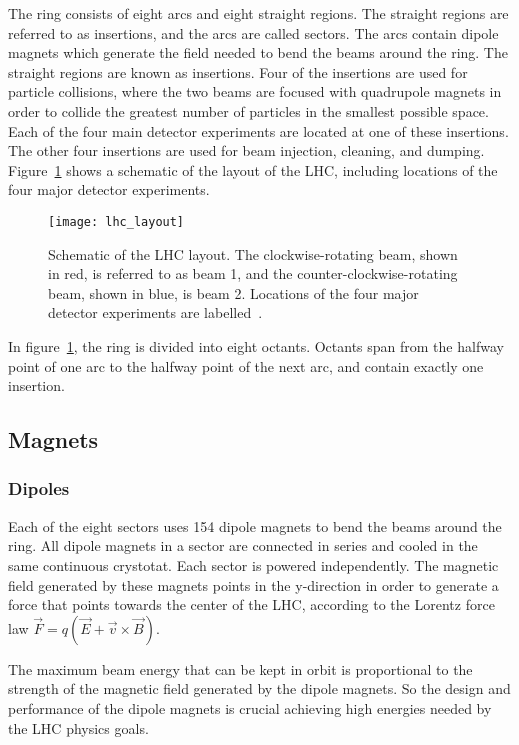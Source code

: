 The ring consists of eight arcs and eight straight regions.
The straight regions are referred to as insertions, and the arcs are called sectors.
The arcs contain dipole magnets which generate the field needed to bend the beams around the ring.
The straight regions are known as insertions.
Four of the insertions are used for particle collisions,
where the two beams are focused with quadrupole magnets in order to collide the greatest number of particles in the smallest possible space.
Each of the four main detector experiments are located at one of these insertions.
The other four insertions are used for beam injection, cleaning, and dumping.
Figure~\ref{fig:lhc_layout} shows a schematic of the layout of the LHC, including locations of the four major detector experiments.

\begin{figure}[!ht]\centering
\texttt{[image: lhc\_layout]}
\caption{Schematic of the LHC layout.
The clockwise-rotating beam, shown in red, is referred to as beam 1, and the counter-clockwise-rotating beam, shown in blue, is beam 2.
Locations of the four major detector experiments are labelled~\cite{lhc-machine-2008}.}
\label{fig:lhc_layout}
\end{figure}

In figure~\ref{fig:lhc_layout}, the ring is divided into eight octants.
Octants span from the halfway point of one arc to the halfway point of the next arc,
and contain exactly one insertion.

\subsection{Magnets}\label{subsec:lhc_magnets}

\subsubsection{Dipoles}
Each of the eight sectors uses 154 dipole magnets to bend the beams around the ring.
All dipole magnets in a sector are connected in series and cooled in the same continuous crystotat.
Each sector is powered independently.
The magnetic field generated by these magnets points in the y-direction
in order to generate a force that points towards the center of the LHC,
according to the Lorentz force law $\vec{F} = q\left(\vec{E}+\vec{v}\times\vec{B}\right)$.

The maximum beam energy that can be kept in orbit is proportional to the strength of the magnetic field generated by the dipole magnets.
So the design and performance of the dipole magnets is crucial achieving high energies needed by the LHC physics goals.

